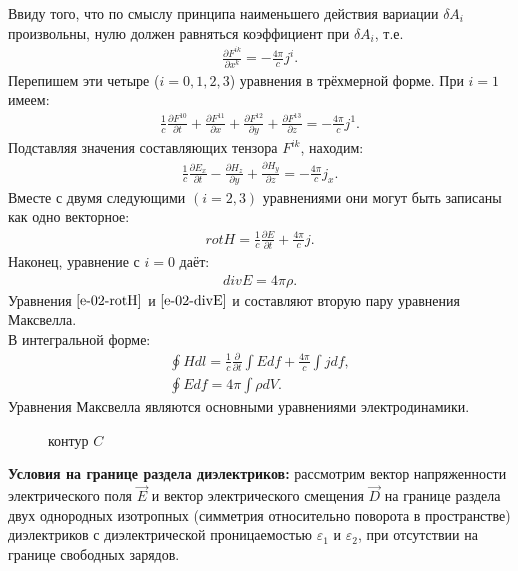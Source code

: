 \documentclass[__main__.tex]{subfiles}
\begin{document}
Ввиду того, что по смыслу принципа наименьшего действия вариации $\delta A_i$ произвольны, нулю должен равняться коэффициент при $\delta A_i$, т.е.
\begin{gather}
	\label{e-02-deltaF}
	\frac{\partial F^{ik}}{\partial x^k} = -\frac{4\pi}{c}j^i.
\end{gather}
Перепишем эти четыре ($i = 0, 1, 2, 3$) уравнения в трёхмерной форме. При $i=1$ имеем:
\begin{gather*}
	\frac{1}{c}\frac{\partial F^{10}}{\partial t} + \frac{\partial F^{11}}{\partial x} + \frac{\partial F^{12}}{\partial y} + \frac{\partial F^{13}}{\partial z} = -\frac{4\pi}{c}j^1.
\end{gather*}
Подставляя значения составляющих тензора $F^{ik}$, находим:
\begin{gather*}
	\frac{1}{c}\frac{\partial E_x}{\partial t} - \frac{\partial H_z}{\partial y} + \frac{\partial H_y}{\partial z} = -\frac{4\pi}{c}j_x.
\end{gather*}
Вместе с двумя следующими $(i = 2, 3)$ уравнениями они могут быть записаны как одно векторное:
\begin{gather}
	\label{e-02-rotH}
	rot H = \frac{1}{c}\frac{\partial E}{\partial t} + \frac{4\pi}{c}j.
\end{gather}
Наконец, уравнение с $i=0$ даёт:
\begin{gather}
\label{e-02-divE}
	div E = 4\pi\rho.
\end{gather}
Уравнения $\ref{e-02-rotH}$ и $\ref{e-02-divE}$ и составляют вторую пару уравнения Максвелла.\\
В интегральной форме:\\
\begin{gather*}
	\oint Hdl = \frac{1}{c}\frac{\partial}{\partial t}\int Edf + \frac{4\pi}{c}\int jdf,\\
	\oint Edf = 4\pi\int \rho dV.
\end{gather*}
 Уравнения Максвелла являются основными уравнениями электродинамики.\\

\begin{wrapfigure}{r}{.3\linewidth}
\centering
\def\svgwidth{1\linewidth}

\caption{контур $C$}
\end{wrapfigure}

\textbf{Условия на границе раздела диэлектриков:} рассмотрим вектор напряженности электрического поля $\vec{E}$ и вектор электрического смещения $\vec{D}$ на границе раздела двух однородных изотропных (симметрия относительно поворота в пространстве) диэлектриков с диэлектрической проницаемостью $\varepsilon_1$ и $\varepsilon_2$, при отсутствии на границе свободных зарядов.
\end{document}
